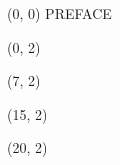 \documentclass[10pt]{article}
\begin{document}
\begin{textblock}{31}(0, 0)
\center\huge PREFACE
\end{textblock}

\begin{textblock}{6}(0, 2)
    {}
\end{textblock}

\begin{textblock}{7}(7, 2)
    {}
\end{textblock}

\begin{textblock}{4}(15, 2)
    {}
\end{textblock}

\begin{textblock}{11}(20, 2)
    {}
\end{textblock}
\end{document}
